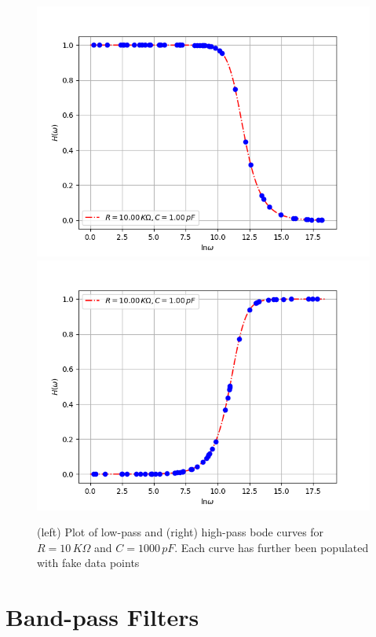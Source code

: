 \documentclass[english]{article}
\begin{document}
\begin{figure}
	\centering
	\label{fig:mockrc}
	\includegraphics[scale=0.4]{mock_low.png}
	\includegraphics[scale=0.4]{mock_high.png}
	\caption{(left) Plot of low-pass and (right) high-pass bode curves for $R=10\,K\Omega$ and $C=1000\,pF$.
	Each curve has further been populated with fake data points}
\end{figure}

\section{Band-pass Filters}
\end{document}

